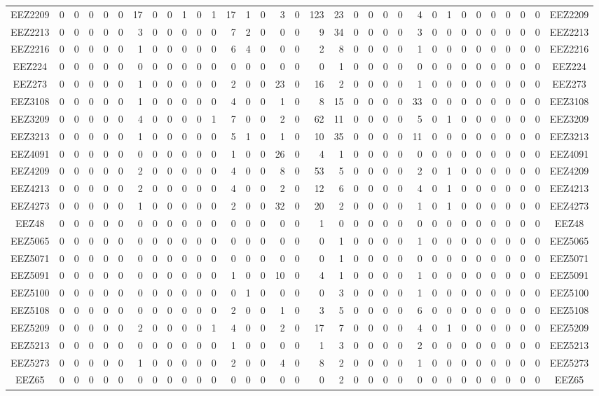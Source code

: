 \documentclass[10pt,a4paper,twoside]{report}
\begin{document}
{\begin{tabular}{crrrrrrrrrrrrrrrrrrrrrrrrrrrrrrrc}
EEZ2209&0&0&0&0&0&17&0&0&1&0&1&17&1&0&3&0&123&23&0&0&0&0&4&0&1&0&0&0&0&0&0&EEZ2209\\
EEZ2213&0&0&0&0&0&3&0&0&0&0&0&7&2&0&0&0&9&34&0&0&0&0&3&0&0&0&0&0&0&0&0&EEZ2213\\
EEZ2216&0&0&0&0&0&1&0&0&0&0&0&6&4&0&0&0&2&8&0&0&0&0&1&0&0&0&0&0&0&0&0&EEZ2216\\
EEZ224&0&0&0&0&0&0&0&0&0&0&0&0&0&0&0&0&0&1&0&0&0&0&0&0&0&0&0&0&0&0&0&EEZ224\\
EEZ273&0&0&0&0&0&1&0&0&0&0&0&2&0&0&23&0&16&2&0&0&0&0&1&0&0&0&0&0&0&0&0&EEZ273\\
EEZ3108&0&0&0&0&0&1&0&0&0&0&0&4&0&0&1&0&8&15&0&0&0&0&33&0&0&0&0&0&0&0&0&EEZ3108\\
EEZ3209&0&0&0&0&0&4&0&0&0&0&1&7&0&0&2&0&62&11&0&0&0&0&5&0&1&0&0&0&0&0&0&EEZ3209\\
EEZ3213&0&0&0&0&0&1&0&0&0&0&0&5&1&0&1&0&10&35&0&0&0&0&11&0&0&0&0&0&0&0&0&EEZ3213\\
EEZ4091&0&0&0&0&0&0&0&0&0&0&0&1&0&0&26&0&4&1&0&0&0&0&0&0&0&0&0&0&0&0&0&EEZ4091\\
EEZ4209&0&0&0&0&0&2&0&0&0&0&0&4&0&0&8&0&53&5&0&0&0&0&2&0&1&0&0&0&0&0&0&EEZ4209\\
EEZ4213&0&0&0&0&0&2&0&0&0&0&0&4&0&0&2&0&12&6&0&0&0&0&4&0&1&0&0&0&0&0&0&EEZ4213\\
EEZ4273&0&0&0&0&0&1&0&0&0&0&0&2&0&0&32&0&20&2&0&0&0&0&1&0&1&0&0&0&0&0&0&EEZ4273\\
EEZ48&0&0&0&0&0&0&0&0&0&0&0&0&0&0&0&0&1&0&0&0&0&0&0&0&0&0&0&0&0&0&0&EEZ48\\
EEZ5065&0&0&0&0&0&0&0&0&0&0&0&0&0&0&0&0&0&1&0&0&0&0&1&0&0&0&0&0&0&0&0&EEZ5065\\
EEZ5071&0&0&0&0&0&0&0&0&0&0&0&0&0&0&0&0&0&1&0&0&0&0&0&0&0&0&0&0&0&0&0&EEZ5071\\
EEZ5091&0&0&0&0&0&0&0&0&0&0&0&1&0&0&10&0&4&1&0&0&0&0&1&0&0&0&0&0&0&0&0&EEZ5091\\
EEZ5100&0&0&0&0&0&0&0&0&0&0&0&0&1&0&0&0&0&3&0&0&0&0&1&0&0&0&0&0&0&0&0&EEZ5100\\
EEZ5108&0&0&0&0&0&0&0&0&0&0&0&2&0&0&1&0&3&5&0&0&0&0&6&0&0&0&0&0&0&0&0&EEZ5108\\
EEZ5209&0&0&0&0&0&2&0&0&0&0&1&4&0&0&2&0&17&7&0&0&0&0&4&0&1&0&0&0&0&0&0&EEZ5209\\
EEZ5213&0&0&0&0&0&0&0&0&0&0&0&1&0&0&0&0&1&3&0&0&0&0&2&0&0&0&0&0&0&0&0&EEZ5213\\
EEZ5273&0&0&0&0&0&1&0&0&0&0&0&2&0&0&4&0&8&2&0&0&0&0&1&0&0&0&0&0&0&0&0&EEZ5273\\
EEZ65&0&0&0&0&0&0&0&0&0&0&0&0&0&0&0&0&0&2&0&0&0&0&0&0&0&0&0&0&0&0&0&EEZ65\\

\end{tabular}}
\end{document}
